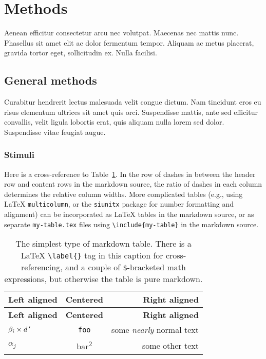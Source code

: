 \documentclass[12pt,oneside]{article}
\begin{document}
\section{Methods}\label{methods}

Aenean efficitur consectetur arcu nec volutpat. Maecenas nec mattis
nunc. Phasellus sit amet elit ac dolor fermentum tempor. Aliquam ac
metus placerat, gravida tortor eget, sollicitudin ex. Nulla facilisi.

\subsection{General methods}\label{general-methods}

Curabitur hendrerit lectus malesuada velit congue dictum. Nam tincidunt
eros eu risus elementum ultrices sit amet quis orci. Suspendisse mattis,
ante sed efficitur convallis, velit ligula lobortis erat, quis aliquam
nulla lorem sed dolor. Suspendisse vitae feugiat augue.

\subsubsection{Stimuli}\label{stimuli}

Here is a cross-reference to Table~\ref{tab-simple}. In the row of
dashes in between the header row and content rows in the markdown
source, the ratio of dashes in each column determines the relative
column widths. More complicated tables (e.g., using LaTeX
\texttt{multicolumn}, or the \texttt{siunitx} package for number
formatting and alignment) can be incorporated as LaTeX tables in the
markdown source, or as separate \texttt{my-table.tex} files using
\texttt{\textbackslash{}include\{my-table\}} in the markdown source.

\begin{longtable}[]{@{}lcr@{}}
\caption{The simplest type of markdown table. There is a LaTeX
\texttt{\textbackslash{}label\{\}} tag in this caption for
cross-referencing, and a couple of \texttt{\$}-bracketed math
expressions, but otherwise the table is pure markdown.
\label{tab-simple}}\tabularnewline
\toprule
\textbf{Left aligned} & \textbf{Centered} & \textbf{Right
aligned}\tabularnewline
\midrule
\endfirsthead
\toprule
\textbf{Left aligned} & \textbf{Centered} & \textbf{Right
aligned}\tabularnewline
\midrule
\endhead
\(\beta_i \times d\thinspace^\prime\) & \texttt{foo} & some \emph{nearly} normal
text\tabularnewline
\(\alpha_j\) & bar\textsuperscript{2} & some other text\tabularnewline
\bottomrule
\end{longtable}
\end{document}
